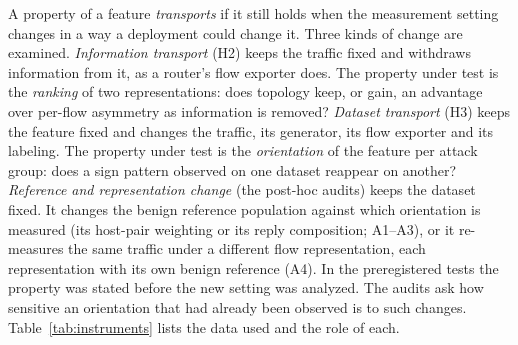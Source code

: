 \documentclass[preprint,12pt]{elsarticle}
\begin{document}
A property of a feature \emph{transports} if it still holds when the measurement setting changes in a way a deployment could change it. Three kinds of change are examined.
\emph{Information transport} (H2) keeps the traffic fixed and withdraws information from it, as a router's flow exporter does. The property under test is the \emph{ranking} of two representations: does topology keep, or gain, an advantage over per-flow asymmetry as information is removed?
\emph{Dataset transport} (H3) keeps the feature fixed and changes the traffic, its generator, its flow exporter and its labeling. The property under test is the \emph{orientation} of the feature per attack group: does a sign pattern observed on one dataset reappear on another?
\emph{Reference and representation change} (the post-hoc audits) keeps the dataset fixed. It changes the benign reference population against which orientation is measured (its host-pair weighting or its reply composition; A1--A3), or it re-measures the same traffic under a different flow representation, each representation with its own benign reference (A4).
In the preregistered tests the property was stated before the new setting was analyzed. The audits ask how sensitive an orientation that had already been observed is to such changes. Table~\ref{tab:instruments} lists the data used and the role of each.

\begin{table}[H]
\caption{Data, flow exporter, labeling, analysis and evidential status.\label{tab:instruments}}
\centering
\footnotesize
{}
\end{table}
\end{document}
